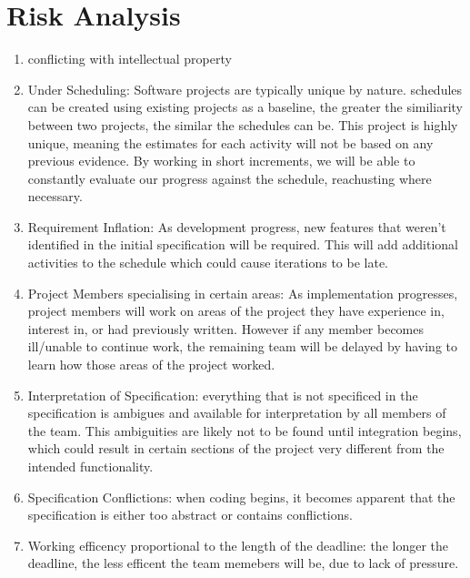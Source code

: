 \section{Risk Analysis}
\label{section:risk}

\begin{enumerate}
\item
conflicting with intellectual property

\item
Under Scheduling:
Software projects are typically unique by nature.
schedules can be created using existing projects as a baseline, the greater the similiarity between two projects, the similar the schedules can be.
This project is highly unique, meaning the estimates for each activity will not be based on any previous evidence.
By working in short increments, we will be able to constantly evaluate our progress against the schedule, reachusting where necessary.

\item
Requirement Inflation:
As development progress, new features that weren't identified in the initial specification will be required.
This will add additional activities to the schedule which could cause iterations to be late.

\item
Project Members specialising in certain areas:
As implementation progresses, project members will work on areas of the project they have experience in, interest in, or had previously written.
However if any member becomes ill/unable to continue work, the remaining team will be delayed by having to learn how those areas of the project worked.

\item
Interpretation of Specification:
everything that is not specificed in the specification is ambigues and available for interpretation by all members of the team.
This ambiguities are likely not to be found until integration begins, which could result in certain sections of the project very different from the intended functionality.

\item
Specification Conflictions:
when coding begins, it becomes apparent that the specification is either too abstract or contains conflictions.

\item
Working efficency proportional to the length of the deadline:
the longer the deadline, the less efficent the team memebers will be, due to lack of pressure.

\end{enumerate}

